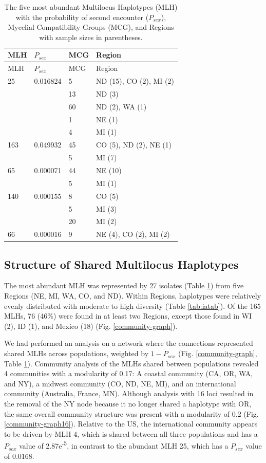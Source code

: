\documentclass[fleqn,10pt,lineno]{wlpeerj} %
\theoremstyle{definition}
\theoremstyle{definition}
\theoremstyle{definition}
\theoremstyle{remark}
\begin{document}
\begin{longtable}[]{@{}llll@{}}
\caption{\label{tab:mlg-table} The five most abundant Multilocus Haplotypes
(MLH) with the probability of second encounter (\(P_{sex}\)), Mycelial
Compatibility Groups (MCG), and Regions with sample sizes in
parentheses.}\tabularnewline
\toprule
MLH & \(P_{sex}\) & MCG & Region\tabularnewline
\midrule
\endfirsthead
\toprule
MLH & \(P_{sex}\) & MCG & Region\tabularnewline
\midrule
\endhead
25 & 0.016824 & 5 & ND (15), CO (2), MI (2)\tabularnewline
& & 13 & ND (3)\tabularnewline
& & 60 & ND (2), WA (1)\tabularnewline
& & 1 & NE (1)\tabularnewline
& & 4 & MI (1)\tabularnewline
163 & 0.049932 & 45 & CO (5), ND (2), NE (1)\tabularnewline
& & 5 & MI (7)\tabularnewline
65 & 0.000071 & 44 & NE (10)\tabularnewline
& & 5 & MI (1)\tabularnewline
140 & 0.000155 & 8 & CO (5)\tabularnewline
& & 5 & MI (3)\tabularnewline
& & 20 & MI (2)\tabularnewline
66 & 0.000016 & 9 & NE (4), CO (2), MI (2)\tabularnewline
\bottomrule
\end{longtable}

\subsection*{Structure of Shared Multilocus
Haplotypes}\label{structure-of-shared-multilocus-haplotypes}

The most abundant MLH was represented by 27 isolates (Table
\ref{tab:mlg-table}) from five Regions (NE, MI, WA, CO, and ND). Within
Regions, haplotypes were relatively evenly distributed with moderate to
high diversity (Table \ref{tab:iatab}). Of the 165 MLHs, 76 (46\%) were
found in at least two Regions, except those found in WI (2), ID (1), and
Mexico (18) (Fig. \ref{community-graph}).

We had performed an analysis on a network where the connections
represented shared MLHs across populations, weighted by \(1 - P_{sex}\)
(Fig. \ref{community-graph}, Table \ref{tab:mlg-table}). Community
analysis of the MLHs shared between populations revealed 4 communities
with a modularity of 0.17: A coastal community (CA, OR, WA, and NY), a
midwest community (CO, ND, NE, MI), and an international community
(Australia, France, MN). Although analysis with 16 loci resulted in the
removal of the NY node because it no longer shared a haplotype with OR,
the same overall community structure was present with a modularity of
0.2 (Fig. \ref{community-graph16}). Relative to the US, the
international community appears to be driven by MLH 4, which is shared
between all three populations and has a \(P_{sex}\) value of
2.87e\textsuperscript{-5}, in contrast to the abundant MLH 25, which has
a \(P_{sex}\) value of 0.0168.
\end{document}
